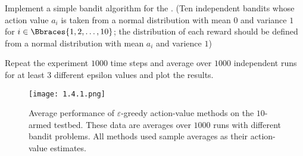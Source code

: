 
\begin{exercise}

Implement a simple bandit algorithm for the .
(Ten independent bandits whose action value $a_i$ is taken from a normal distribution with mean $0$ and variance $1$ for $i \in \Bbraces{1, 2, \dots, 10}$; the distribution of each reward should be defined from a normal distribution with mean $a_i$ and varience $1$)

Repeat the experiment $1000$ time steps and average over $1000$ independent runs for at least $3$ different epsilon values and plot the results.

\end{exercise}


\begin{solution}

\phantom{}

\begin{figure}[H]
    \centering
    \texttt{[image: 1.4.1.png]}
    \caption
    {
        Average performance of $\varepsilon$-greedy action-value methods on the $10$-armed testbed.
        These data are averages over $1000$ runs with different bandit problems.
        All methods used sample averages as their action-value estimates.
    }
    \label{fig:3}
\end{figure}

\end{solution}

